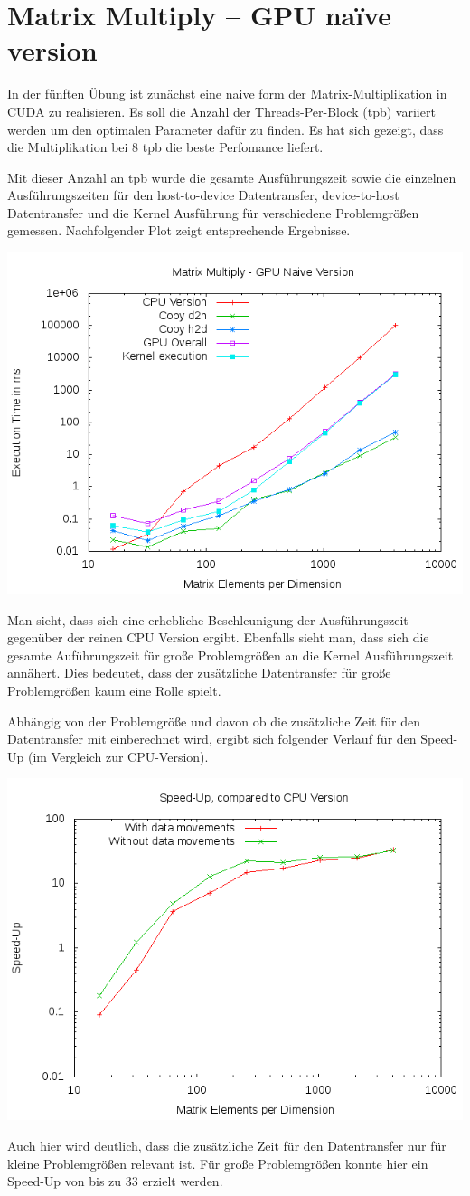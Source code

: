 \documentclass{article}
\newcommand{\enterProblemHeader}[1]{
}
\newcommand{\exitProblemHeader}[1]{
}
\newcounter{homeworkProblemCounter} %
\newcommand{\homeworkProblemName}{}
\newenvironment{homeworkProblem}[1][Problem \arabic{homeworkProblemCounter}]{ %
\stepcounter{homeworkProblemCounter} %
\renewcommand{\homeworkProblemName}{#1} %
\section{\homeworkProblemName} %
}{
}
\begin{document}
\begin{homeworkProblem}[Matrix Multiply – GPU naïve version]
In der fünften Übung ist zunächst eine naive form der Matrix-Multiplikation in CUDA zu 
realisieren. Es soll die Anzahl der Threads-Per-Block (tpb) variiert werden um den optimalen
Parameter dafür zu finden. Es hat sich gezeigt, dass die Multiplikation bei 8 tpb 
die beste Perfomance liefert.

Mit dieser Anzahl an tpb wurde die gesamte Ausführungszeit sowie die einzelnen
Ausführungszeiten für den host-to-device Datentransfer, device-to-host Datentransfer
und die Kernel Ausführung für verschiedene Problemgrößen gemessen. Nachfolgender 
Plot zeigt entsprechende Ergebnisse.
\begin{center}
\includegraphics[width=0.8\columnwidth]{globmatmul.png}
\end{center}
Man sieht, dass sich eine erhebliche Beschleunigung der Ausführungszeit gegenüber der
reinen CPU Version ergibt. Ebenfalls sieht man, dass sich die gesamte Auführungszeit 
für große Problemgrößen an die Kernel Ausführungszeit annähert. Dies bedeutet, dass
der zusätzliche Datentransfer für große Problemgrößen kaum eine Rolle spielt.

Abhängig von der Problemgröße und davon ob die zusätzliche Zeit für den Datentransfer
mit einberechnet wird, ergibt sich folgender Verlauf für den Speed-Up (im Vergleich 
zur CPU-Version).
\begin{center}
\includegraphics[width=0.8\columnwidth]{speed-up_glob.png}
\end{center}
Auch hier wird deutlich, dass die zusätzliche Zeit für den Datentransfer nur für
kleine Problemgrößen relevant ist. Für große Problemgrößen konnte hier ein
Speed-Up von bis zu 33 erzielt werden.
\end{homeworkProblem}
\end{document}
